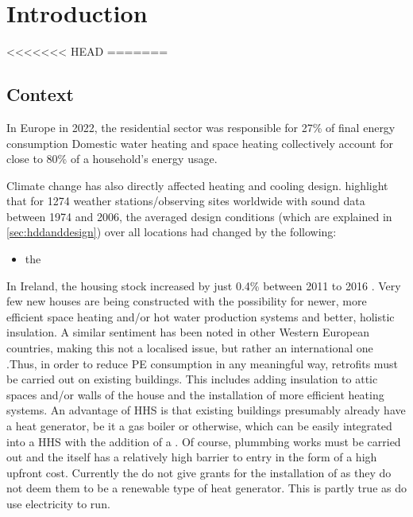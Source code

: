 \chapter{Introduction}\label{ch:intro}


<<<<<<< HEAD
=======

\section{Context}

In Europe in 2022, the  residential sector was responsible for 27\% of final energy consumption \cite{}
Domestic water heating and space heating collectively account for close to 80\% of a household's energy usage. \cite{}

Climate change has also directly affected heating and cooling design. \citeauthor{owen_ashrae_2009} highlight that for \num{1274} weather stations/observing sites worldwide with sound data between 1974 and 2006, the averaged design conditions (which are explained in \cref{sec:hddanddesign}) over all locations had changed by the following:
\begin{itemize}
    \item the 
\end{itemize}

In Ireland, the housing stock increased by just 0.4\% between 2011 to 2016 \cite{cso_2020}. Very few new houses are being constructed with the possibility for newer, more efficient space heating and/or hot water production systems and better, holistic insulation. A similar sentiment has been noted in other Western European countries, making this not a localised issue, but rather an international one \cite{klein_numerical_2014, dongellini_influence_2021} .Thus, in order to reduce \ac{PE} consumption in any meaningful way, retrofits must be carried out on existing buildings. This includes adding insulation to attic spaces and/or walls of the house and the installation of more efficient heating systems. An advantage of \acs{HHS} is that existing buildings presumably already have a heat generator, be it a gas boiler or otherwise, which can be easily integrated into a \ac{HHS} with the addition of a \HP. Of course, plummbing works must be carried out and the \HP itself has a relatively high barrier to entry in the form of a high upfront cost. Currently the \citeauthor{seai_2020} do not give grants for the installation of \HPs as they do not deem them to be a renewable type of heat generator. This is partly true as \HPs do use electricity to run. 

